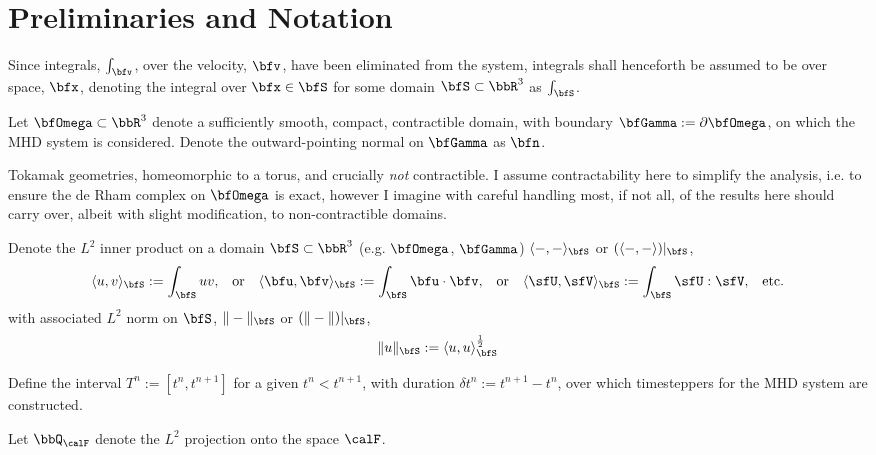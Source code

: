 \section*{Preliminaries and Notation}
    Since integrals, $\int_{\bfv}$, over the velocity, $\bfv$, have been eliminated from the system, integrals shall henceforth be assumed to be over space, $\bfx$, denoting the integral over $\bfx  \in  \bfS$ for some domain $\bfS  \subset  \bbR^{3}$ as $\int_{\bfS}$.

    Let $\bfOmega  \subset  \bbR^{3}$ denote a sufficiently smooth, compact, contractible domain, with boundary $\bfGamma  :=  \partial\bfOmega$, on which the MHD system is considered. Denote the outward-pointing normal on $\bfGamma$ as $\bfn$.

    \begin{remark}
        Tokamak geometries, homeomorphic to a torus, and crucially \emph{not} contractible. I assume contractability here to simplify the analysis, i.e. to ensure the de Rham complex on $\bfOmega$ is exact, however I imagine with careful handling most, if not all, of the results here should carry over, albeit with slight modification, to non-contractible domains.
    \end{remark}
    
    Denote the $L^{2}$ inner product on a domain $\bfS  \subset  \bbR^{3}$ (e.g. $\bfOmega$, $\bfGamma$) $\langle-, -\rangle_{\bfS}$ or $(\langle-, -\rangle)|_{\bfS}$,
    \begin{align}
        \langle u,    v   \rangle_{\bfS}  :=  \int_{\bfS}uv,  &&
        \text{or}  &&
        \langle \bfu, \bfv\rangle_{\bfS}  :=  \int_{\bfS}\bfu\cdot\bfv,  &&
        \text{or}  &&
        \langle \sfU, \sfV\rangle_{\bfS}  :=  \int_{\bfS}\sfU:\sfV,  &&
        \text{etc.}
    \end{align}
    with associated $L^{2}$ norm on $\bfS$, $\|-\|_{\bfS}$ or $(\|-\|)|_{\bfS}$,
    \begin{equation}
        \|u\|_{\bfS}  :=  \langle u, u\rangle_{\bfS}^{\frac{1}{2}}
    \end{equation}

    Define the interval $T^{n}  :=  \left[t^{n}, t^{n + 1}\right]$ for a given $t^{n}  <  t^{n + 1}$, with duration $\delta t^{n}  :=  t^{n + 1} - t^{n}$, over which timesteppers for the MHD system are constructed.

    Let $\bbQ_{\calF}$ denote the $L^{2}$ projection onto the space $\calF$.
    